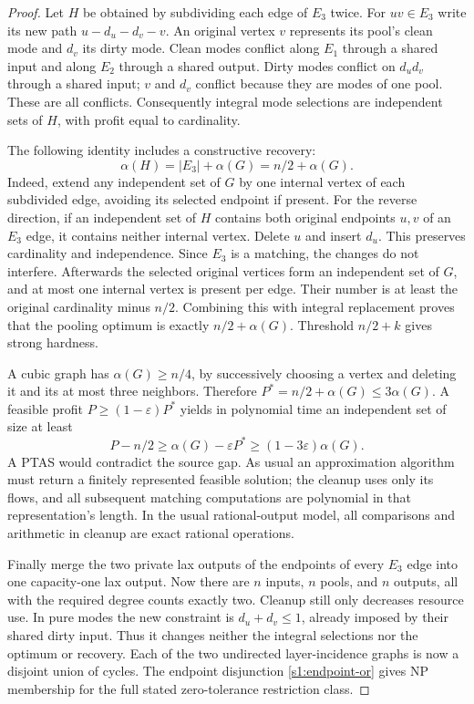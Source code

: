 \begin{proof}
Let $H$ be obtained by subdividing each edge of $E_3$ twice. For
$uv\in E_3$ write its new path $u-d_u-d_v-v$. An original vertex $v$
represents its pool's clean mode and $d_v$ its dirty mode. Clean modes
conflict along $E_1$ through a shared input and along $E_2$ through a
shared output. Dirty modes conflict on $d_ud_v$ through a shared input;
$v$ and $d_v$ conflict because they are modes of one pool. These are
all conflicts. Consequently integral mode selections are independent
sets of $H$, with profit equal to cardinality.

The following identity includes a constructive recovery:
\begin{equation}
 \alpha(H)=|E_3|+\alpha(G)=n/2+\alpha(G).\label{s3:is-identity}
\end{equation}
Indeed, extend any independent set of $G$ by one internal vertex of
each subdivided edge, avoiding its selected endpoint if present. For
the reverse direction, if an independent set of $H$ contains both
original endpoints $u,v$ of an $E_3$ edge, it contains neither internal
vertex. Delete $u$ and insert $d_u$. This preserves cardinality and
independence. Since $E_3$ is a matching, the changes do not interfere.
Afterwards the selected original vertices form an independent set of
$G$, and at most one internal vertex is present per edge. Their number
is at least the original cardinality minus $n/2$. Combining this with
integral replacement proves that the pooling optimum is exactly
$n/2+\alpha(G)$. Threshold $n/2+k$ gives strong hardness.

A cubic graph has $\alpha(G)\ge n/4$, by successively choosing a vertex
and deleting it and its at most three neighbors. Therefore
$P^*=n/2+\alpha(G)\le3\alpha(G)$. A feasible profit
$P\ge(1-\varepsilon)P^*$ yields in polynomial time an independent set
of size at least
\begin{equation}
 P-n/2\ge\alpha(G)-\varepsilon P^*
 \ge(1-3\varepsilon)\alpha(G).\label{s3:gap-transfer}
\end{equation}
A PTAS would contradict the source gap. As usual an approximation
algorithm must return a finitely represented feasible solution; the
cleanup uses only its flows, and all subsequent matching computations are polynomial in that
representation's length. In the usual rational-output model, all
comparisons and arithmetic in cleanup are exact rational operations.

Finally merge the two private lax outputs of the endpoints of every
$E_3$ edge into one capacity-one lax output. Now there are $n$ inputs,
$n$ pools, and $n$ outputs, all with the required degree counts exactly
two. Cleanup still only decreases resource use. In pure modes the new
constraint is $d_u+d_v\le1$, already imposed by their shared dirty input.
Thus it changes neither the integral selections nor the optimum or
recovery. Each of the two undirected layer-incidence graphs is now a
disjoint union of cycles. The endpoint disjunction
\eqref{s1:endpoint-or} gives NP membership for the full stated
zero-tolerance restriction class.
\end{proof}

